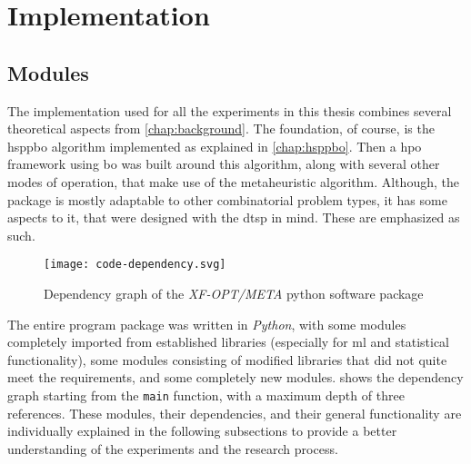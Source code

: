 

\chapter{Implementation}
\label{chap:implementation}

\section{Modules}
\label{chap:modules}

The implementation used for all the experiments in this thesis combines several theoretical aspects from \cref{chap:background}. The foundation, of course, is the \gls{hsppbo} algorithm implemented as explained in \cref{chap:hsppbo}. Then a \gls{hpo} framework using \gls{bo} was built around this algorithm, along with several other modes of operation, that make use of the metaheuristic algorithm. Although, the package is mostly adaptable to other combinatorial problem types, it has some aspects to it, that were designed with the \gls{dtsp} in mind. These are emphasized as such.

\begin{figure}[h]
	\centering
	\texttt{[image: code-dependency.svg]}
	\caption{Dependency graph of the \textit{XF-OPT/META} python software package}
	\label{fig:dependency}
\end{figure}

The entire program package was written in \textit{Python}, with some modules completely imported from established libraries (especially for \gls{ml} and statistical functionality), some modules consisting of modified libraries that did not quite meet the requirements, and some completely new modules.  shows the dependency graph starting from the \texttt{main} function, with a maximum depth of three references. 
These modules, their dependencies, and their general functionality are individually explained in the following subsections to provide a better understanding of the experiments and the research process.

